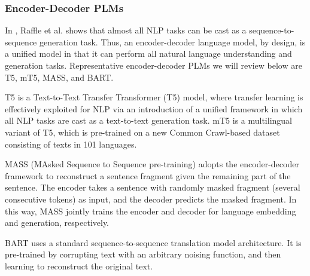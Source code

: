 \documentclass[conference]{IEEEtran}
\begin{document}
\subsubsection{Encoder-Decoder PLMs}

In \cite{raffel2020exploring}, Raffle et al. shows that almost all NLP tasks can be cast as a sequence-to-sequence generation task. Thus, an encoder-decoder language model, by design, is a unified model in that it can perform all natural language understanding and generation tasks.
Representative encoder-decoder PLMs we will review below are T5, mT5, MASS, and BART.

T5 \cite{raffel2020exploring} is a Text-to-Text Transfer Transformer (T5) model, where transfer learning is effectively exploited for NLP via an introduction of a unified framework in which all NLP tasks are cast as a text-to-text generation task.
mT5 \cite{xue2020mt5} is a multilingual variant of T5, which is pre-trained on a new Common Crawl-based dataset consisting of texts in 101 languages.

MASS (MAsked Sequence to Sequence pre-training) \cite{song2019mass} adopts the encoder-decoder framework to reconstruct a sentence fragment given the remaining part of the sentence. The encoder takes a sentence with randomly masked fragment (several consecutive tokens) as input, and the decoder predicts the masked fragment. In this way, MASS jointly trains the encoder and decoder for language embedding and generation, respectively. 

BART \cite{lewis2019bart} uses a standard sequence-to-sequence translation model architecture. It is pre-trained by corrupting text with an arbitrary noising function, and then learning to reconstruct the original text. 


\end{document}
